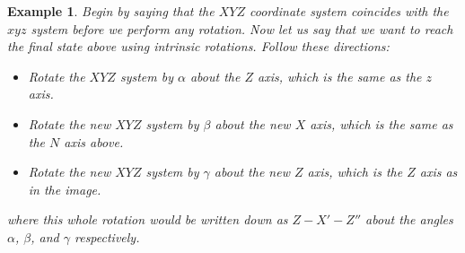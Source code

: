 \documentclass[12pt, letterpaper, onecolumn, conference, final]{IEEEtran}
\theoremstyle{definition}
\newtheorem{definition}{Definition}
\theoremstyle{plain}
\newtheorem{example}{Example}
\begin{document}
\begin{example}
Begin by saying that the $XYZ$ coordinate system coincides with the $xyz$ system before we perform any rotation. Now let us say that we want to reach the final state above using intrinsic rotations. Follow these directions:
\begin{itemize}

\item
Rotate the $XYZ$ system by $\alpha$ about the $Z$ axis, which is the same as the $z$ axis.

\item
Rotate the new $XYZ$ system by $\beta$ about the new $X$ axis, which is the same as the $N$ axis above.

\item
Rotate the new $XYZ$ system by $\gamma$ about the new $Z$ axis, which is the $Z$ axis as in the image.

\end{itemize}
where this whole rotation would be written down as $Z-X'-Z''$ about the angles $\alpha$, $\beta$, and $\gamma$ respectively.
\end{example}

\vspace{.3cm}
\begin{center}
\end{center}

\vspace{.3cm}
\begin{center}
\end{center}
\end{document}
